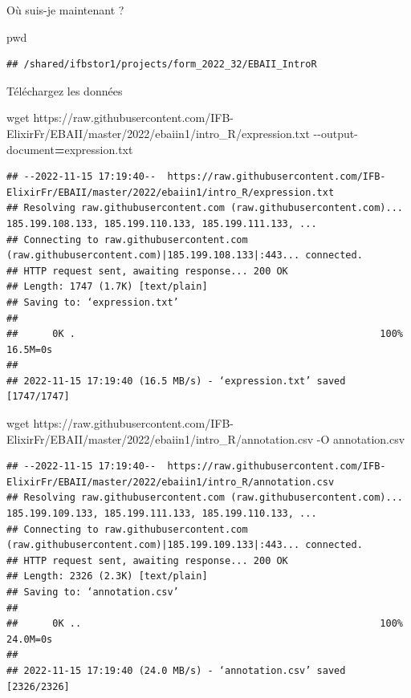 \documentclass[
]{book}
\newenvironment{Shaded}{\begin{snugshade}}{\end{snugshade}}
\newcommand{\AttributeTok}[1]{\textcolor[rgb]{0.77,0.63,0.00}{#1}}
\newcommand{\BuiltInTok}[1]{#1}
\newcommand{\FunctionTok}[1]{\textcolor[rgb]{0.00,0.00,0.00}{#1}}
\newcommand{\NormalTok}[1]{#1}
\newcommand{\OperatorTok}[1]{\textcolor[rgb]{0.81,0.36,0.00}{\textbf{#1}}}
\begin{document}
Où suis-je maintenant ?

\begin{Shaded}
\begin{Highlighting}[]
\BuiltInTok{pwd}
\end{Highlighting}
\end{Shaded}

\begin{verbatim}
## /shared/ifbstor1/projects/form_2022_32/EBAII_IntroR
\end{verbatim}

Téléchargez les données

\begin{Shaded}
\begin{Highlighting}[]
\FunctionTok{wget}\NormalTok{ https://raw.githubusercontent.com/IFB{-}ElixirFr/EBAII/master/2022/ebaiin1/intro\_R/expression.txt }\AttributeTok{{-}{-}output{-}document}\OperatorTok{=}\NormalTok{expression.txt}
\end{Highlighting}
\end{Shaded}

\begin{verbatim}
## --2022-11-15 17:19:40--  https://raw.githubusercontent.com/IFB-ElixirFr/EBAII/master/2022/ebaiin1/intro_R/expression.txt
## Resolving raw.githubusercontent.com (raw.githubusercontent.com)... 185.199.108.133, 185.199.110.133, 185.199.111.133, ...
## Connecting to raw.githubusercontent.com (raw.githubusercontent.com)|185.199.108.133|:443... connected.
## HTTP request sent, awaiting response... 200 OK
## Length: 1747 (1.7K) [text/plain]
## Saving to: ‘expression.txt’
## 
##      0K .                                                     100% 16.5M=0s
## 
## 2022-11-15 17:19:40 (16.5 MB/s) - ‘expression.txt’ saved [1747/1747]
\end{verbatim}

\begin{Shaded}
\begin{Highlighting}[]
\FunctionTok{wget}\NormalTok{ https://raw.githubusercontent.com/IFB{-}ElixirFr/EBAII/master/2022/ebaiin1/intro\_R/annotation.csv }\AttributeTok{{-}O}\NormalTok{ annotation.csv}
\end{Highlighting}
\end{Shaded}

\begin{verbatim}
## --2022-11-15 17:19:40--  https://raw.githubusercontent.com/IFB-ElixirFr/EBAII/master/2022/ebaiin1/intro_R/annotation.csv
## Resolving raw.githubusercontent.com (raw.githubusercontent.com)... 185.199.109.133, 185.199.111.133, 185.199.110.133, ...
## Connecting to raw.githubusercontent.com (raw.githubusercontent.com)|185.199.109.133|:443... connected.
## HTTP request sent, awaiting response... 200 OK
## Length: 2326 (2.3K) [text/plain]
## Saving to: ‘annotation.csv’
## 
##      0K ..                                                    100% 24.0M=0s
## 
## 2022-11-15 17:19:40 (24.0 MB/s) - ‘annotation.csv’ saved [2326/2326]
\end{verbatim}
\end{document}
